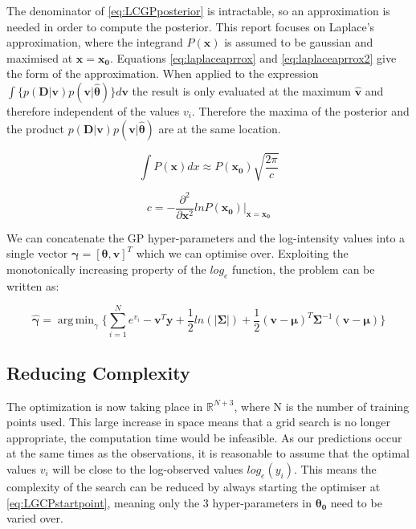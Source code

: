 \documentclass[a4paper,11pt]{report}
\DeclareMathOperator*{\argmin}{arg\,min}
\begin{document}
\doublespacing

The denominator of \ref{eq:LCGPposterior} is intractable, so an approximation is needed in order to compute the posterior. This report focuses on Laplace's approximation, where the integrand \(P(\mathbf{x})\) is assumed to be gaussian and maximised at \(\mathbf{x=x_0}\). Equations \ref{eq:laplaceaprrox} and \ref{eq:laplaceaprrox2} give the form of the approximation. \cite{Mackay} When applied to the expression \(\int{\{p(\mathbf{D|v}) p(\mathbf{v}|\hat{\boldsymbol{\theta}})\} d\mathbf{v}} \) the result is only evaluated at the maximum \(\hat{\mathbf{v}}\) and therefore independent of the values \(v_i\). Therefore the maxima of the posterior and the product \(p(\mathbf{D|v}) p(\mathbf{v}|\hat{\boldsymbol{\theta}})\) are at the same location.

\singlespacing

\begin{equation} \label{eq:laplaceaprrox}
\int{P(\mathbf{x}) dx} \approx P(\mathbf{x_0}) \sqrt{\frac{2\pi}{c}}
\end{equation} 

\begin{equation} \label{eq:laplaceaprrox2}
c = - \frac{\partial^2}{\partial \mathbf{x}^2} ln P(\mathbf{x_0}) |_{\mathbf{x}=\mathbf{x_0}}
\end{equation}

\doublespacing 

We can concatenate the GP hyper-parameters and the log-intensity values into a single vector \( \boldsymbol{\gamma} = [\boldsymbol{\theta}, \mathbf{v}]^{T}\) which we can optimise over. Exploiting the monotonically increasing property of the \(log_e\) function, the problem can be written as:

\begin{equation} \label{eq:GPfmin}
\hat{\boldsymbol{\gamma}} = \argmin_\gamma{\{ \sum_{i=1}^{N}e^{v_i} - \mathbf{v}^{T}\mathbf{y} + \frac{1}{2}ln(|\boldsymbol{\Sigma}|) + \frac{1}{2}(\mathbf{v}-\boldsymbol{\mu})^{T}\boldsymbol{\Sigma}^{-1}(\mathbf{v}-\boldsymbol{\mu})\}}
\end{equation}


\subsection{Reducing Complexity}

The optimization is now taking place in \(\mathds{R}^{N+3}\), where N is the number of training points used. This large increase in space means that a grid search is no longer appropriate, the computation time would be infeasible. As our predictions occur at the same times as the observations, it is reasonable to assume that the optimal values \(v_i\) will be close to the log-observed values \(log_e(y_i)\). This means the complexity of the search can be reduced by always starting the optimiser at \ref{eq:LGCPstartpoint}, meaning only the 3 hyper-parameters in \(\boldsymbol{\theta_0}\) need to be varied over. \par
\end{document}
